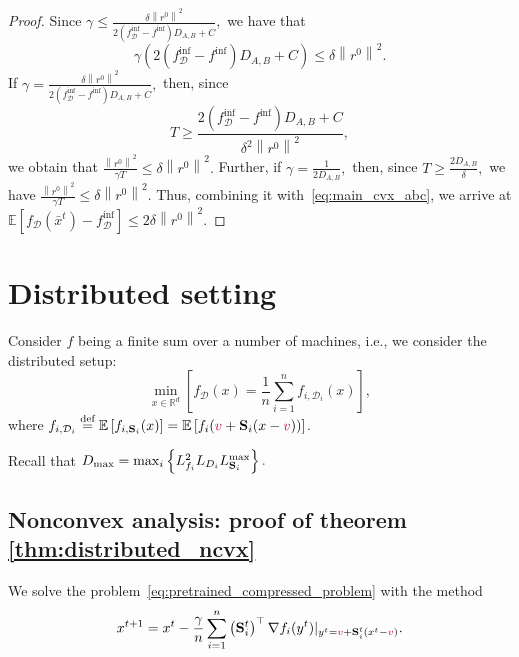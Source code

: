 \documentclass{article}
\newcommand{\shift}{{\color{purple}s}}
\newcommand{\bb}{\mathbb}
\newcommand{\R}{\bb R}
\newcommand{\norm}[1]{\left\| #1 \right\|}
\newcommand{\cD}{\mathcal{D}}
\newcommand{\eqdef}{\stackrel{\text{def}}{=}}
\newcommand{\Exp}[1]{{\bb E}\left[#1\right]}
\theoremstyle{plain}
\newcommand{\tf}{f_{\mathcal{D}}}
\renewcommand{\shift}{{\color{purple}v}}
\newcommand{\mS}{{\bf S}}
\theoremstyle{plain}
\theoremstyle{definition}
\theoremstyle{remark}
\begin{document}
\begin{proof}
	Since $\gamma\leq\frac{\delta\norm{r^0}^2}{2\left(\tf^{\inf} - f^{\inf}\right)D_{A,B}+ C},$ we have that
	\begin{equation*}
		\gamma\left(2\left(\tf^{\inf} - f^{\inf}\right)D_{A,B}+ C\right)\leq\delta\norm{r^0}^2.
	\end{equation*}
	If $\gamma = \frac{\delta\norm{r^0}^2}{2\left(\tf^{\inf} - f^{\inf}\right)D_{A,B}+ C},$ then, since
	\begin{equation*}
		T \geq \frac{2\left(\tf^{\inf} - f^{\inf}\right)D_{A,B}+ C}{\delta^2\norm{r^0}^2},
	\end{equation*}
	we obtain that $\frac{\norm{r^0}^2}{\gamma T}\leq \delta\norm{r^0}^2.$ Further, if $\gamma = \frac{1}{2D_{A,B}},$ then, since $T\geq \frac{2D_{A,B}}{\delta},$ we have $\frac{\norm{r^0}^2}{\gamma T}\leq\delta\norm{r^0}^2.$ Thus, combining it with~\eqref{eq:main_cvx_abc}, we arrive at $\Exp{\tf(\bar{x}^t) - \tf^{\inf}}\leq 2\delta\left\|r^0\right\|^2.$
\end{proof}
\clearpage
\section{Distributed setting}
Consider $f$ being a finite sum over a number of machines, i.e., we consider the distributed setup:
\[ \min_{x\in \R^d} \left[f_{\cD}(x) =  \frac{1}{n}\sum_{i=1}^n f_{i, \cD_i} (x)\right],\]
where $f_{i, \cD_i} \eqdef \Exp{f_{i, \mS_i}(x)} = \Exp{f_i(\shift + \mS_i (x-\shift))}$.

Recall that $D_{\max} = \max_{i}\left\lbrace L_{f_i}^2L_{D_i}L_{\mS_i}^{\max}\right\rbrace.$
\subsection{Nonconvex analysis: proof of theorem \ref{thm:distributed_ncvx}}
We solve the problem~\eqref{eq:pretrained_compressed_problem} with the method
\begin{equation}\label{alg:finsum_noncvx_appendix}
	x^{t+1} = x^t - \frac{\gamma}{n} \sum_{i=1}^{n}\left(\mS^{t}_i\right)^{\top} \nabla f_i(y^t)|_{y^t=\shift + \mS^{t}_i (x^t - \shift)}.
\end{equation}
\end{document}

